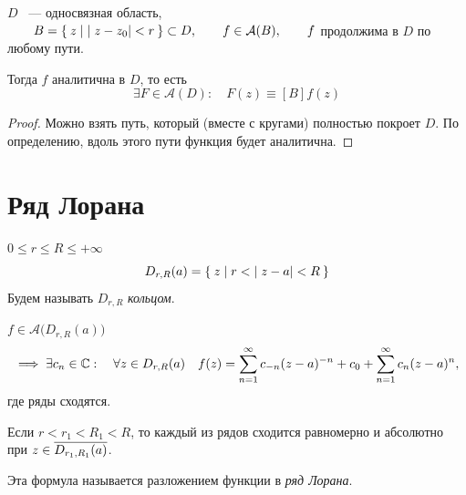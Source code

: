 \begin{theorem}
	$ D $ ~--- односвязная область, $ \qquad B = \Set{z \mid |z - z_0| < r} \subset D, \qquad f \in \mathcal A(B), \qquad f $ продолжима в $ D $ по любому пути.

	Тогда $ f $ аналитична в $ D $, то есть
	$$ \exists F \in \mathcal A(D) : \quad F(z) \equiv[B] f(z) $$
\end{theorem}

\begin{proof}
	Можно взять путь, который (вместе с кругами) полностью покроет $ D $.
	По определению, вдоль этого пути функция будет аналитична.
\end{proof}

\section{Ряд Лорана}

\begin{definition}
	$ 0 \le r \le R \le +\infty $
	$$ D_{r, R}(a) = \Set{z \mid r < |z - a| < R} $$
	Будем называть $ D_{r, R} $ \emph{кольцом}.
\end{definition}

\begin{theorem}
	$ f \in \mathcal A \big(D_{r, R}(a) \big) $
	$$ \implies \exists c_n \in \mathbb{C} : \quad \forall z \in D_{r, R}(a) \quad f(z) = \sum_{n = 1}^\infty c_{-n}(z - a)^{-n} + c_0 + \sum_{n = 1}^\infty c_n(z - a)^n, $$
	где ряды сходятся.

	Если $ r < r_1 < R_1 < R $, то каждый из рядов сходится равномерно и абсолютно при $ z \in \overline{D_{r_1, R_1}(a)} $.

	Эта формула называется разложением функции в \emph{ряд Лорана}.
\end{theorem}

